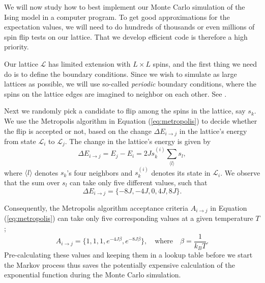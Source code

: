 \documentclass[]{article}
\begin{document}
\vspace{5mm}

We will now study how to best implement our Monte Carlo simulation of the Ising model in a computer program. To get good approximations for the expectation values, we will need to do hundreds of thousands or even millions of spin flip tests on our lattice. That we develop efficient code is therefore a high priority.

Our lattice $\mathcal{L}$ has limited extension with $L \times L$ spins, and the first thing we need do is to define the boundary conditions. Since we wish to simulate as large lattices as possible, we will use so-called \textit{periodic} boundary conditions, where the spins on the lattice edges are imagined to neighbor on each other. See \cite{fys4150-notes}.

Next we randomly pick a candidate to flip among the spins in the lattice, say $s_k$. We use the Metropolis algorithm in Equation (\ref{eq:metropolis}) to decide whether the flip is accepted or not, based on the change $\Delta E_{i \rightarrow j}$ in the lattice's energy from state $\mathcal{L}_i$ to $\mathcal{L}_j$. The change in the lattice's energy is given by
\begin{equation} \label{eq:dE}
	\Delta E_{i \rightarrow j} = E_j - E_i = 2J s_k^{(i)} \sum_{\langle l \rangle} s_l,
\end{equation}
where $\langle l \rangle$ denotes $s_k$'s four neighbors and $s_k^{(i)}$ denotes its state in $\mathcal{L}_i$. We observe that the sum over $s_l$ can take only five different values, such that
\begin{equation}
	\Delta E_{i \rightarrow j} = \{-8J, -4J, 0, 4J, 8J \}.
\end{equation}

Consequently, the Metropolis algorithm acceptance criteria $A_{i \rightarrow j}$ in Equation (\ref{eq:metropolis}) can take only five corresponding values at a given temperature $T$;
\begin{equation} \label{eq:metropolis-acceptance}
	A_{i \rightarrow j} = \{ 1, 1, 1, e^{-4J \beta}, e^{-8J \beta} \}, \quad \text{where} \quad \beta = \frac{1}{k_BT}.
\end{equation}
Pre-calculating these values and keeping them in a lookup table before we start the Markov process thus saves the potentially expensive calculation of the exponential function during the Monte Carlo simulation.
\end{document}
